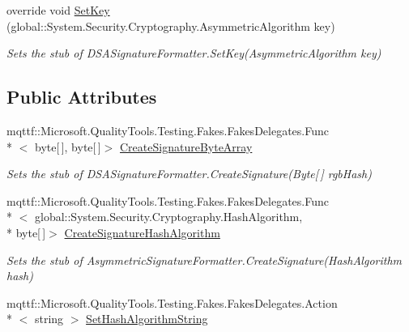 \begin{DoxyCompactItemize}
override void \hyperlink{class_system_1_1_security_1_1_cryptography_1_1_fakes_1_1_stub_d_s_a_signature_formatter_a7d26af1194ca78c9a85a381e352b551c}{Set\-Key} (global\-::\-System.\-Security.\-Cryptography.\-Asymmetric\-Algorithm key)
\begin{DoxyCompactList}\small\item\em Sets the stub of D\-S\-A\-Signature\-Formatter.\-Set\-Key(\-Asymmetric\-Algorithm key)\end{DoxyCompactList}\end{DoxyCompactItemize}
\subsection*{Public Attributes}
\begin{DoxyCompactItemize}
\item 
mqttf\-::\-Microsoft.\-Quality\-Tools.\-Testing.\-Fakes.\-Fakes\-Delegates.\-Func\\*
$<$ byte\mbox{[}$\,$\mbox{]}, byte\mbox{[}$\,$\mbox{]}$>$ \hyperlink{class_system_1_1_security_1_1_cryptography_1_1_fakes_1_1_stub_d_s_a_signature_formatter_af9979432fa7b12595ab8d7e27f48d834}{Create\-Signature\-Byte\-Array}
\begin{DoxyCompactList}\small\item\em Sets the stub of D\-S\-A\-Signature\-Formatter.\-Create\-Signature(\-Byte\mbox{[}$\,$\mbox{]} rgb\-Hash)\end{DoxyCompactList}\item 
mqttf\-::\-Microsoft.\-Quality\-Tools.\-Testing.\-Fakes.\-Fakes\-Delegates.\-Func\\*
$<$ global\-::\-System.\-Security.\-Cryptography.\-Hash\-Algorithm, \\*
byte\mbox{[}$\,$\mbox{]}$>$ \hyperlink{class_system_1_1_security_1_1_cryptography_1_1_fakes_1_1_stub_d_s_a_signature_formatter_a277069232ec2ec4d04f5f180b3402222}{Create\-Signature\-Hash\-Algorithm}
\begin{DoxyCompactList}\small\item\em Sets the stub of Asymmetric\-Signature\-Formatter.\-Create\-Signature(\-Hash\-Algorithm hash)\end{DoxyCompactList}\item 
mqttf\-::\-Microsoft.\-Quality\-Tools.\-Testing.\-Fakes.\-Fakes\-Delegates.\-Action\\*
$<$ string $>$ \hyperlink{class_system_1_1_security_1_1_cryptography_1_1_fakes_1_1_stub_d_s_a_signature_formatter_a043ab12eb86ee36e04d58dd01e7d02b6}{Set\-Hash\-Algorithm\-String}

\end{DoxyCompactItemize}
